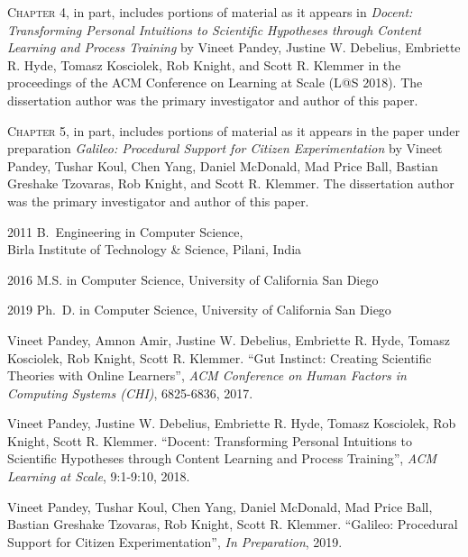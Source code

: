 \begin{frontmatter}
\begin{acknowledgements}
\textsc{Chapter 4}, in part, includes portions of material as it appears in \emph{Docent: Transforming Personal Intuitions to Scientific Hypotheses through Content Learning and Process Training} by Vineet Pandey, Justine W. Debelius, Embriette R. Hyde, Tomasz Kosciolek, Rob Knight, and Scott R. Klemmer in the proceedings of the ACM Conference on Learning at Scale (L@S 2018). The dissertation author was the primary investigator and author of this paper.

\textsc{Chapter 5}, in part, includes portions of material as it appears in the paper under preparation \emph{Galileo: Procedural Support for Citizen Experimentation} by Vineet Pandey, Tushar Koul, Chen Yang, Daniel McDonald, Mad Price Ball, Bastian Greshake Tzovaras, Rob Knight, and Scott R. Klemmer. The dissertation author was the primary investigator and author of this paper.

\end{acknowledgements}

%
%
\begin{vitapage}
\begin{vita}
  \item[2011] B.~Engineering in Computer Science, \\Birla Institute of Technology \& Science, Pilani, India
  \item[2016] M.S. in Computer Science, University of California San Diego
  \item[2019] Ph.~D. in Computer Science, University of California San Diego
\end{vita}
\begin{publications}
 \item Vineet Pandey, Amnon Amir, Justine W. Debelius, Embriette R. Hyde, Tomasz Kosciolek, Rob Knight, Scott R. Klemmer. ``Gut Instinct: Creating Scientific Theories
with Online Learners'', \emph{ACM Conference on Human Factors in Computing Systems (CHI)}, 6825-6836, 2017.
\item Vineet Pandey, Justine W. Debelius, Embriette R. Hyde, Tomasz Kosciolek, Rob Knight, Scott R. Klemmer. ``Docent: Transforming Personal Intuitions to Scientific Hypotheses
through Content Learning and Process Training'', \emph{ACM Learning at Scale}, 9:1-9:10,  2018.
\item Vineet Pandey, Tushar Koul, Chen Yang, Daniel McDonald, Mad Price Ball, Bastian Greshake Tzovaras, Rob Knight, Scott R. Klemmer. ``Galileo: Procedural Support for Citizen Experimentation'', \emph{In Preparation},  2019.


\end{publications}
\end{vitapage}
\end{frontmatter}
